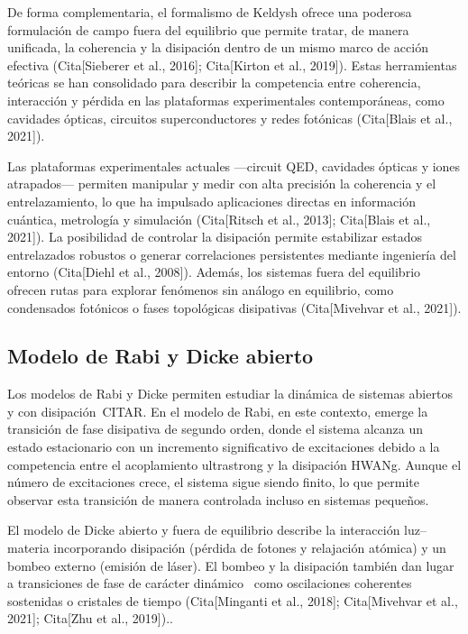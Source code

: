 \documentclass[onecolumn,notitlepage,letterpaper,aps,pra,12pt]{article}
\numberwithin{equation}{section}
\begin{document}
De forma complementaria, el formalismo de Keldysh ofrece una poderosa formulación de campo fuera del equilibrio que permite tratar, de manera unificada, la coherencia y la disipación dentro de un mismo marco de acción efectiva (Cita[Sieberer et al., 2016]; Cita[Kirton et al., 2019]). Estas herramientas teóricas se han consolidado para describir la competencia entre coherencia, interacción y pérdida en las plataformas experimentales contemporáneas, como cavidades ópticas, circuitos superconductores y redes fotónicas (Cita[Blais et al., 2021]).

Las plataformas experimentales actuales —circuit QED, cavidades ópticas y iones atrapados— permiten manipular y medir con alta precisión la coherencia y el entrelazamiento, lo que ha impulsado aplicaciones directas en información cuántica, metrología y simulación (Cita[Ritsch et al., 2013]; Cita[Blais et al., 2021]). La posibilidad de controlar la disipación permite estabilizar estados entrelazados robustos o generar correlaciones persistentes mediante ingeniería del entorno (Cita[Diehl et al., 2008]). Además, los sistemas fuera del equilibrio ofrecen rutas para explorar fenómenos sin análogo en equilibrio, como condensados fotónicos o fases topológicas disipativas (Cita[Mivehvar et al., 2021]). 

\subsection{Modelo de Rabi y Dicke abierto}

Los modelos de Rabi y Dicke permiten estudiar la dinámica de sistemas abiertos y con disipación~CITAR. En el modelo de Rabi, en este contexto, emerge la transición de fase disipativa de segundo orden, donde el sistema alcanza un estado estacionario con un incremento significativo de excitaciones debido a la competencia entre el acoplamiento ultrastrong y la disipación HWANg. Aunque el número de excitaciones crece, el sistema sigue siendo finito, lo que permite observar esta transición de manera controlada incluso en sistemas pequeños.

El modelo de Dicke abierto y fuera de equilibrio describe la interacción luz–materia incorporando disipación (pérdida de fotones y relajación atómica) y un bombeo externo (emisión de láser). El bombeo y la disipación también dan lugar a transiciones de fase de carácter dinámico~\cite{kirton2017,LeBoite2020} como oscilaciones coherentes sostenidas o cristales de tiempo (Cita[Minganti et al., 2018]; Cita[Mivehvar et al., 2021]; Cita[Zhu et al., 2019])..
\end{document}

